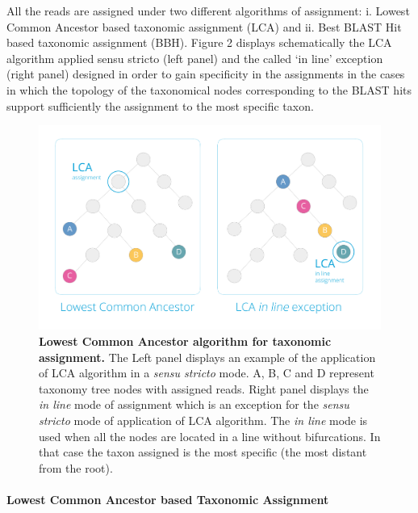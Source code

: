 \documentclass[fleqn,10pt,lineno]{wlpeerj}
\begin{document}
All the reads are assigned under two different algorithms of assignment:
i. Lowest Common Ancestor based taxonomic assignment (LCA) and ii. Best
BLAST Hit based taxonomic assignment (BBH). Figure 2 displays
schematically the LCA algorithm applied sensu stricto (left panel) and
the called `in line' exception (right panel) designed in order to gain
specificity in the assignments in the cases in which the topology of the
taxonomical nodes corresponding to the BLAST hits support sufficiently
the assignment to the most specific taxon.

\begin{figure}[htbp]
\centering
\includegraphics{./Figure-2.jpg}
\caption{\textbf{Lowest Common Ancestor algorithm for taxonomic
assignment.} The Left panel displays an example of the application of
LCA algorithm in a \emph{sensu stricto} mode. A, B, C and D represent
taxonomy tree nodes with assigned reads. Right panel displays the
\emph{in line} mode of assignment which is an exception for the
\emph{sensu stricto} mode of application of LCA algorithm. The \emph{in
line} mode is used when all the nodes are located in a line without
bifurcations. In that case the taxon assigned is the most specific (the
most distant from the root).}
\end{figure}

\paragraph{Lowest Common Ancestor based Taxonomic
Assignment}\label{lowest-common-ancestor-based-taxonomic-assignment}
\end{document}
